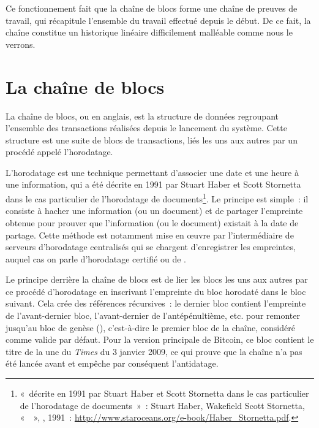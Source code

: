 Ce fonctionnement fait que la chaîne de blocs forme une chaîne de preuves de travail, qui récapitule l'ensemble du travail effectué depuis le début. De ce fait, la chaîne constitue un historique linéaire difficilement malléable comme nous le verrons.

\section*{La chaîne de blocs}

La chaîne de blocs, ou  en anglais, est la structure de données regroupant l'ensemble des transactions réalisées depuis le lancement du système. Cette structure est une suite de blocs de transactions, liés les uns aux autres par un procédé appelé l'horodatage.


L'horodatage est une technique permettant d'associer une date et une heure à une information, qui a été décrite en 1991 par Stuart Haber et Scott Stornetta dans le cas particulier de l'horodatage de documents\footnote{«~décrite en 1991 par Stuart Haber et Scott Stornetta dans le cas particulier de l'horodatage de documents~»~: Stuart Haber, Wakefield Scott Stornetta, «~~», , 1991~: \url{http://www.staroceans.org/e-book/Haber_Stornetta.pdf}.}. Le principe est simple~: il consiste à hacher une information (ou un document) et de partager l'empreinte obtenue pour prouver que l'information (ou le document) existait à la date de partage. Cette méthode est notamment mise en œuvre par l'intermédiaire de serveurs d'horodatage centralisés qui se chargent d'enregistrer les empreintes, auquel cas on parle d'horodatage certifié ou de .

Le principe derrière la chaîne de blocs est de lier les blocs les uns aux autres par ce procédé d'horodatage en inscrivant l'empreinte du bloc horodaté dans le bloc suivant. Cela crée des références récursives~: le dernier bloc contient l'empreinte de l'avant-dernier bloc, l'avant-dernier de l'antépénultième, etc. pour remonter jusqu'au bloc de genèse (), c'est-à-dire le premier bloc de la chaîne, considéré comme valide par défaut. Pour la version principale de Bitcoin, ce bloc contient le titre de la une du \emph{Times} du 3 janvier 2009, ce qui prouve que la chaîne n'a pas été lancée avant et empêche par conséquent l'antidatage.

